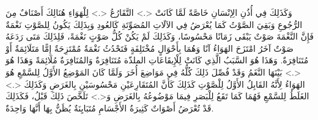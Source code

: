 \documentclass{article}
\begin{document}
وَكَذَلِكَ فِي أُذُنِ الِإنْسَانِ خَاصَّةً لَمَّا كَانَتْ <.> التَّقَارُعُ <.> لِلْهَوَاءِ هُنَالِكَ أَصْنَافٌ مِنَ الرُّجُوعِ وَبَقِيَ الصَّوْتُ كَمَا يُعْرَضُ فِي الآلَاتِ المُصَوِّتَةِ كَالعُودِ وَبِذَلِكَ يَكُونُ لِلصَّوْتِ نَغْمَةٌ فَإِنَّ النَّغْمَةَ صَوْتٌ يَبْقَى زَمَانًا مَحْسُوسًا، وَكَذَلِكَ لَمْ يَكُنْ كُلُّ صَوْتٍ نَغْمَةً، فَلِذَلِكَ مَتَى رَدَعَهُ صَوْتٌ آخَرُ امْتَزَحَ الهَوَاءُ آنًا وَهُمَا بِأَحْوَالٍ مُخْتَلِفَةٍ فَتَحْدُثُ نَغْمَةٌ مُمْتَزِحَةٌ إِمًّا مَتَلَائِمَةٌ أَوْ مُتَنَافِرَةٌ. وَهَذَا هُوَ السَّبَبُ الَّذِي كَانَتْ لِلْإِيقَاعَاتِ  الملذّة مُتَنَافِرَةٌ وَالمُنَافِرَةٌ مُلَائِمَةً وَهَذَا هُوَ <.> بَيْنَهَا النَّغَمُ وَقَدْ فُصِّلَ ذَلِكَ كُلُّهُ فِي مَوَاضِعَ أُخَرَ وَلَمَّا كَانَ المَوْضِعُ الأَوَّلُ لِلسَّمْعِ هُوَ الهَوَاءُ لِأَنَّهُ القَابِلُ الأَوَّلُ لِلْصَّوْتِ كَذَلِكَ كَأَنَّ المُتَقَارِعَيْنِ مَحْسُوسَيْنِ بِالغَرَضِ وَكَذَلِكَ <.> الغَلَطُ لِلسَّمْعِ فَهُمَا كَمَا تَقَعُ لِلْبَصَرِ فِيمَا مَوْضُوعُهُ بِالغَرَضِ وَ<.> تَلَخَّصَ ذَلِكَ قَبْلُ، فَكَذَلِكَ قَدْ تُعْرَضُ أَصْوَاتٌ كَثِيرَةُ الأَجْسَامِ مُتَبَايِنَةٌ يُظَنُّ بِهَا أَنَّهَا وَاحِدَةٌ.
\pend
\endnumbering
\end{document}
